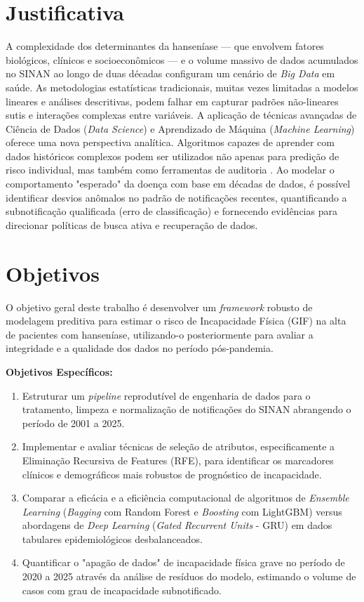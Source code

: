 \documentclass[12pt, a4paper]{report}
\begin{document}
\section{Justificativa}
A complexidade dos determinantes da hanseníase — que envolvem fatores biológicos, clínicos e socioeconômicos — e o volume massivo de dados acumulados no SINAN ao longo de duas décadas configuram um cenário de \textit{Big Data} em saúde. As metodologias estatísticas tradicionais, muitas vezes limitadas a modelos lineares e análises descritivas, podem falhar em capturar padrões não-lineares sutis e interações complexas entre variáveis. A aplicação de técnicas avançadas de Ciência de Dados (\textit{Data Science}) e Aprendizado de Máquina (\textit{Machine Learning}) oferece uma nova perspectiva analítica. Algoritmos capazes de aprender com dados históricos complexos podem ser utilizados não apenas para predição de risco individual, mas também como ferramentas de auditoria \citep{goldstein2020convergence}. Ao modelar o comportamento "esperado" da doença com base em décadas de dados, é possível identificar desvios anômalos no padrão de notificações recentes, quantificando a subnotificação qualificada (erro de classificação) e fornecendo evidências para direcionar políticas de busca ativa e recuperação de dados.

\section{Objetivos}
O objetivo geral deste trabalho é desenvolver um \textit{framework} robusto de modelagem preditiva para estimar o risco de Incapacidade Física (GIF) na alta de pacientes com hanseníase, utilizando-o posteriormente para avaliar a integridade e a qualidade dos dados no período pós-pandemia.

\textbf{Objetivos Específicos:}
\begin{enumerate}
    \item Estruturar um \textit{pipeline} reprodutível de engenharia de dados para o tratamento, limpeza e normalização de notificações do SINAN abrangendo o período de 2001 a 2025.
    \item Implementar e avaliar técnicas de seleção de atributos, especificamente a Eliminação Recursiva de Features (RFE), para identificar os marcadores clínicos e demográficos mais robustos de prognóstico de incapacidade.
    \item Comparar a eficácia e a eficiência computacional de algoritmos de \textit{Ensemble Learning} (\textit{Bagging} com Random Forest e \textit{Boosting} com LightGBM) versus abordagens de \textit{Deep Learning} (\textit{Gated Recurrent Units} - GRU) em dados tabulares epidemiológicos desbalanceados.
    \item Quantificar o "apagão de dados" de incapacidade física grave no período de 2020 a 2025 através da análise de resíduos do modelo, estimando o volume de casos com grau de incapacidade subnotificado.
\end{enumerate}
\end{document}
